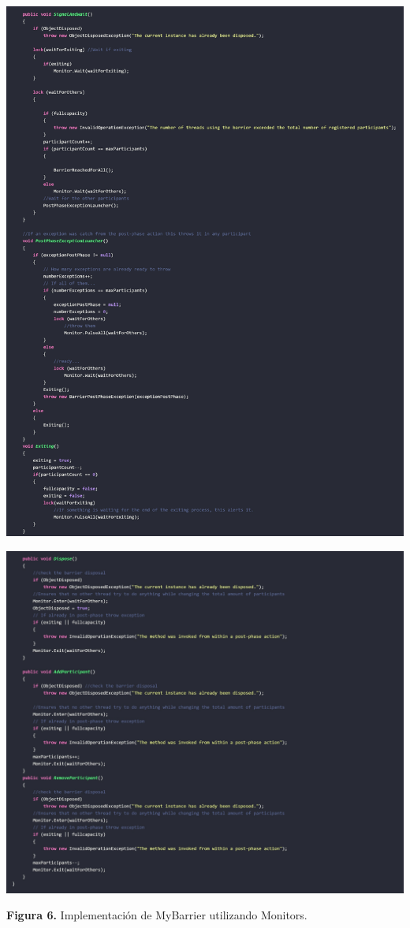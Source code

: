 \documentclass[10pt]{article} %
\newcommand{\imgcaption}[2]{\tiny \textbf{Figura #1.} #2.}
\begin{document}
\begin{center}
	\includegraphics[width=15cm]{MyBarrier2.jpg}
\end{center}

\begin{center}
	\includegraphics[width=15cm]{MyBarrier3.jpg}
	
	\imgcaption{6}{Implementaci\'on de MyBarrier utilizando Monitors}
\end{center}
\end{document}
